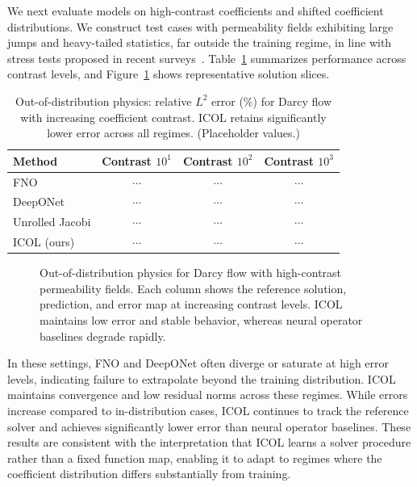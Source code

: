 \documentclass{article}
\begin{document}
We next evaluate models on high-contrast coefficients and shifted coefficient distributions. We construct test cases with permeability fields exhibiting large jumps and heavy-tailed statistics, far outside the training regime, in line with stress tests proposed in recent surveys~\cite{lu2022comprehensive,dong2023operatorreview}. Table~\ref{tab:physics} summarizes performance across contrast levels, and Figure~\ref{fig:physics} shows representative solution slices.

\begin{table}[t]
    \centering
    \caption{Out-of-distribution physics: relative $L^2$ error (\%) for Darcy flow with increasing coefficient contrast. ICOL retains significantly lower error across all regimes. (Placeholder values.)}
    \label{tab:physics}
    \begin{tabular}{lccc}
        \toprule
        Method & Contrast $10^1$ & Contrast $10^2$ & Contrast $10^3$ \\
        \midrule
        FNO            & $\cdots$ & $\cdots$ & $\cdots$ \\
        DeepONet       & $\cdots$ & $\cdots$ & $\cdots$ \\
        Unrolled Jacobi& $\cdots$ & $\cdots$ & $\cdots$ \\
        ICOL (ours)    & $\cdots$ & $\cdots$ & $\cdots$ \\
        \bottomrule
    \end{tabular}
\end{table}

\begin{figure}[t]
    \centering
    \fbox{\rule{0pt}{2.0in}\rule{0.9\linewidth}{0pt}}
    \caption{Out-of-distribution physics for Darcy flow with high-contrast permeability fields. Each column shows the reference solution, prediction, and error map at increasing contrast levels. ICOL maintains low error and stable behavior, whereas neural operator baselines degrade rapidly.}
    \label{fig:physics}
\end{figure}

In these settings, FNO and DeepONet often diverge or saturate at high error levels, indicating failure to extrapolate beyond the training distribution. ICOL maintains convergence and low residual norms across these regimes. While errors increase compared to in-distribution cases, ICOL continues to track the reference solver and achieves significantly lower error than neural operator baselines. These results are consistent with the interpretation that ICOL learns a solver procedure rather than a fixed function map, enabling it to adapt to regimes where the coefficient distribution differs substantially from training.
\end{document}
